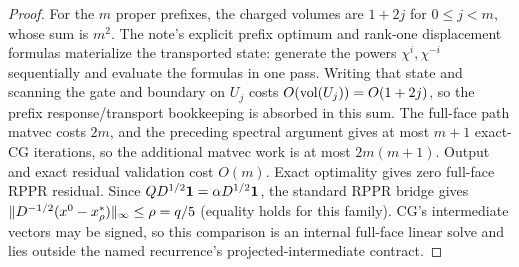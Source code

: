 \begin{proof}
For the $m$ proper prefixes, the charged volumes are $1+2j$ for
$0\le j<m$, whose sum is $m^2$.  The note's explicit prefix optimum and
rank-one displacement formulas materialize the transported state: generate
the powers $\chi^i,\chi^{-i}$ sequentially and evaluate the formulas in one
pass.  Writing that state and scanning the gate and boundary on $U_j$ costs
$O(\operatorname{vol}(U_j))=O(1+2j)$, so the prefix response/transport bookkeeping is
absorbed in this sum.  The full-face path matvec costs $2m$, and the preceding
spectral argument gives at most $m+1$ exact-CG iterations, so the additional
matvec work is at most $2m(m+1)$.  Output and exact residual validation cost
$O(m)$.  Exact optimality gives zero full-face RPPR residual.  Since
$QD^{1/2}\mathbf{1}=\alpha D^{1/2}\mathbf{1}$, the standard RPPR bridge gives
$\lVert D^{-1/2}(x^0-x_\rho^*)\rVert_\infty\le\rho=q/5$ (equality holds for this
family).  CG's intermediate vectors may
be signed, so this comparison is an internal full-face linear solve and lies
outside the named recurrence's projected-intermediate contract.
\end{proof}
